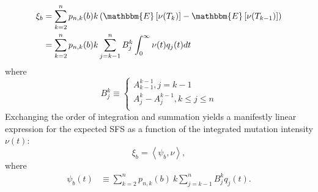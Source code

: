 \documentclass[11pt]{article}
\begin{document}
\begin{align*}
\xi_b &= \sum_{k=2}^n p_{n,k}(b) k \left(\mathbbm{E}\left[\nu(T_{k})\right] - \mathbbm{E}\left[\nu(T_{k-1})\right]\right)\\
&= \sum_{k=2}^n p_{n,k}(b) k \sum_{j=k-1}^{n}B_j^k\int_0^\infty\nu(t)q_j(t)dt
\end{align*}
where
\[
B_j^k \equiv
\begin{cases}
A_{k-1}^{k-1}, j=k-1\\
A_j^k - A_j^{k-1}, k\le j\le n\\
\end{cases}
\]
Exchanging the order of integration and summation yields a manifestly linear expression for the expected SFS as a function of the integrated mutation intensity $\nu(t)$:
\[
\xi_b = \left<\psi_b, \nu\right>,
\]
where
\begin{align*}
\psi_b(t) &\equiv \sum_{k=2}^n p_{n,k}(b)\ k \sum_{j=k-1}^{n}B_j^k q_j(t).
\end{align*}
\end{document}
